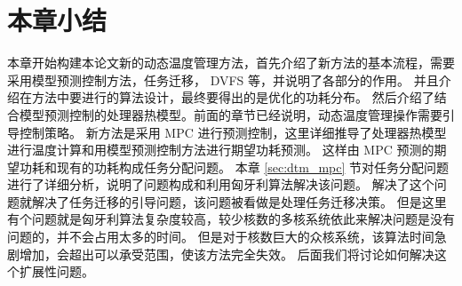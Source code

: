  
  

 

\section{本章小结}\label{sec:xiaojie4}
本章开始构建本论文新的动态温度管理方法，首先介绍了新方法的基本流程，需要采用模型预测控制方法，任务迁移， DVFS 等，并说明了各部分的作用。
并且介绍在方法中要进行的算法设计，最终要得出的是优化的功耗分布。
然后介绍了结合模型预测控制的处理器热模型。前面的章节已经说明，动态温度管理操作需要引导控制策略。
新方法是采用 MPC 进行预测控制，这里详细推导了处理器热模型进行温度计算和用模型预测控制方法进行期望功耗预测。
这样由 MPC 预测的期望功耗和现有的功耗构成任务分配问题。
本章  \ref{sec:dtm_mpc} 节对任务分配问题进行了详细分析，说明了问题构成和利用匈牙利算法解决该问题。
解决了这个问题就解决了任务迁移的引导问题，该问题被看做是处理任务迁移决策。
但是这里有个问题就是匈牙利算法复杂度较高，较少核数的多核系统依此来解决问题是没有问题的，并不会占用太多的时间。
但是对于核数巨大的众核系统，该算法时间急剧增加，会超出可以承受范围，使该方法完全失效。
后面我们将讨论如何解决这个扩展性问题。





























